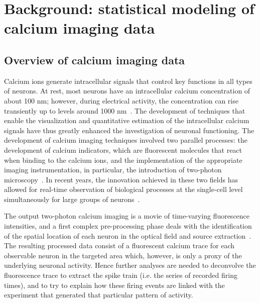 \chapter{Background: statistical modeling of calcium imaging data}
\fancyhead[RO,LE]{\thepage}

\setlength{\parskip}{0.5pt}

\bigskip

\section{Overview of calcium imaging data} 

Calcium ions generate intracellular signals that control key functions in all types of neurons.
At rest, most neurons have an intracellular calcium concentration of about 100 nm; however, during electrical activity, the concentration can rise transiently up to levels around 1000 nm~\citep{berridge2000}. 
The development of techniques that enable the visualization and quantitative estimation of the intracellular calcium signals have thus greatly enhanced the investigation of neuronal functioning.
The development of calcium imaging techniques involved two parallel processes: the development of calcium indicators, which are fluorescent molecules that react when binding to the calcium ions, and the implementation of the appropriate imaging instrumentation, in particular, the introduction of two-photon microscopy~\citep{denk1990}.
In recent years, the innovation achieved in these two fields has allowed for real-time observation of biological processes at the single-cell level simultaneously for large groups of neurons~\citep{grienberger2012}. 

The output two-photon calcium imaging is a movie of time-varying fluorescence intensities, and a first complex pre-processing phase deals with the identification of the spatial location of each neuron in the optical field and source extraction~\citep{mukamel2009,dombeck2010}. The resulting processed data consist of a fluorescent calcium trace for each observable neuron in the targeted area which, however, is only a proxy of the underlying neuronal activity.
Hence further analyses are needed to deconvolve the fluorescence trace to extract the spike train (i.e. the series of recorded firing times), and to try to explain how these firing events are linked with the experiment that generated that particular pattern of activity.

